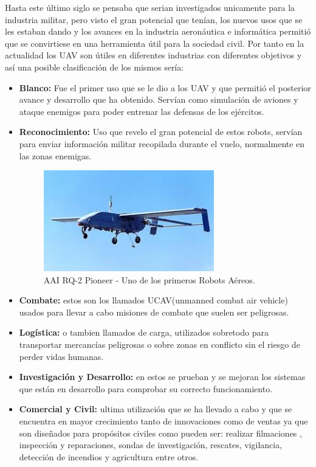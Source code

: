 \hspace{1cm} Hasta este último siglo se pensaba que serian investigados unicamente para la industria militar, pero visto el gran potencial que tenían, los nuevos usos que se les estaban dando y los avances en  la industria aeronáutica e informática permitió que se convirtiese en una herramienta útil para la sociedad civil. Por tanto en la actualidad los UAV son útiles en diferentes industrias con diferentes objetivos y así una posible clasificación de los mismos sería:

\begin{itemize}
		\item \textbf{Blanco:} Fue el primer uso que se le dio a los UAV y que permitió el posterior avance y desarrollo que ha obtenido. Servían como simulación de aviones y ataque enemigos para poder entrenar las defensas de los ejércitos.
		\item\textbf{Reconocimiento:} Uso que revelo el gran potencial de estos robots, servían para enviar información militar recopilada durante el vuelo, normalmente en las zonas enemigas. 
	\begin{figure}[H]
		\begin{center}
			\includegraphics[width=0.7\textwidth]{imag/IMG14.jpeg}
					\caption{AAI RQ-2 Pioneer - Uno de los primeros Robots Aéreos.}
		\label{fig:UAV Pioneer.}	
		\end{center}
	\end{figure}		
		
		\item \textbf{Combate:} estos son los llamados UCAV(unmanned combat air vehicle)	usados para llevar a cabo misiones de combate que suelen ser peligrosas.
		\item \textbf{Logística:} o tambien llamados de carga, utilizados sobretodo para transportar mercancías peligrosas o sobre zonas en conflicto sin el riesgo de perder vidas humanas.
		\item \textbf{Investigación y Desarrollo:} en estos se prueban y se mejoran los sistemas que están en desarrollo para comprobar su correcto funcionamiento.
		\item \textbf{Comercial y Civil:} ultima utilización que se ha llevado a cabo y que se encuentra en mayor crecimiento tanto de innovaciones como de ventas ya que son diseñados para propósitos civiles como pueden ser: realizar filmaciones , inspección y reparaciones, sondas de investigación, rescates, vigilancia, detección de incendios y agricultura entre otros.
\end{itemize}

